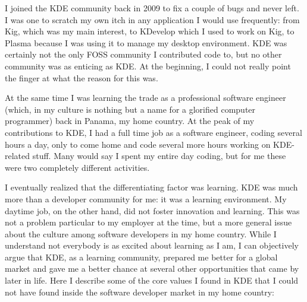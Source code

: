 

\noindent{}I joined the KDE community back in 2009 to fix a couple of bugs and
never left. I was one to scratch my own itch in any application I
would use frequently: from Kig, which was my main interest, to KDevelop
which I used to work on Kig, to Plasma because I was using it to
manage my desktop environment. KDE was certainly not the only
FOSS community I contributed code to, but no other community was as
enticing as KDE. At the beginning, I could not really point the
finger at what the reason for this was.

At the same time I was learning the trade as a professional software
engineer (which, in my culture is nothing but a name for a glorified
computer programmer) back in Panama, my home country. At the peak of
my contributions to KDE, I had a full time job as a software engineer,
coding several hours a day, only to come home and code several more
hours working on KDE-related stuff. Many would say I spent my entire
day coding, but for me these were two completely different activities.

I eventually realized that the differentiating factor was
learning. KDE was much more than a developer community for me: it was
a learning environment. My daytime job, on the other hand, did not
foster innovation and learning. This was not a problem particular to
my employer at the time, but a more general issue about the culture
among software developers in my home country. While I understand not
everybody is as excited about learning as I am, I can objectively
argue that KDE, as a learning community, prepared me better for a
global market and gave me a better chance at several other
opportunities that came by later in life. Here I describe some of the
core values I found in KDE that I could not have found inside the
software developer market in my home country:

